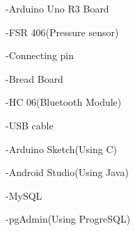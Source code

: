 \documentclass[conference]{IEEEtran}
\begin{document}
%



-Arduino Uno R3 Board

-FSR 406(Pressure sensor)

-Connecting pin

-Bread Board

-HC 06(Bluetooth Module)

-USB cable

-Arduino Sketch(Using C)

-Android Studio(Using Java)

-MySQL

-pgAdmin(Using ProgreSQL)\\
\end{document}
